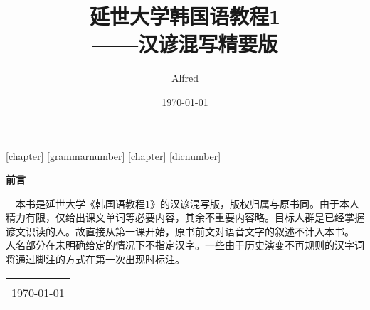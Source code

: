 \title{{\Huge{\textbf{延世大学韩国语教程1}}}\\——汉谚混写精要版}
\author{Alfred}
\date{\today}
\linespread{1.5}
\setsansfont[Mapping=tex-text, Scale=MatchLowercase]{TH-Times.TTF}
\setmonofont[Scale=MatchLowercase]{TH-Times.TTF}
[chapter]
[grammarnumber]
\renewcommand{\thegrammarsection}{\arabic{chapter}.\arabic{grammarnumber} G\arabic{grammarsection}}
\newenvironment{grammar}{\stepcounter{grammarnumber}}{}
\newenvironment{grammarsect}[1][]{\refstepcounter{grammarsection}\par\noindent{\large\arabic{chapter}.\arabic{grammarnumber} G\arabic{grammarsection} #1}\addcontentsline{toc}{subsection}{\thegrammarsection {}  #1}}{\par}
[chapter]
[dicnumber]
\newenvironment{dic}{\stepcounter{dicnumber}}{}
\newenvironment{dicsect}{\stepcounter{dicsection}\par\noindent{\large\arabic{chapter}.\arabic{dicnumber} D\arabic{dicsection}\\}}{\par}


\hypersetup{
    colorlinks=true,
    linkcolor=blue,
    filecolor=blue,
    urlcolor=blue,
    citecolor=cyan,
}
\newcommand{\kr}{\CJKfamily{hanr}}


\maketitle

\setcounter{page}{1}

\begin{center}
    \Huge\textbf{前言}
\end{center}~\
本书是延世大学《韩国语教程1》的汉谚混写版，版权归属与原书同。由于本人精力有限，仅给出课文单词等必要内容，其余不重要内容略。目标人群是已经掌握谚文识读的人。故直接从第一课开始，原书前文对语音文字的叙述不计入本书。\\
人名部分在未明确给定的情况下不指定汉字。一些由于历史演变不再规则的汉字词将通过脚注的方式在第一次出现时标注。
~\
\begin{flushright}
    \begin{tabular}{c}
        \aruby{Alfred}{알프레드}\\
        \today
    \end{tabular}
\end{flushright}

\newpage
{}
\setcounter{page}{1}
\tableofcontents
\newpage
\setcounter{page}{1}

